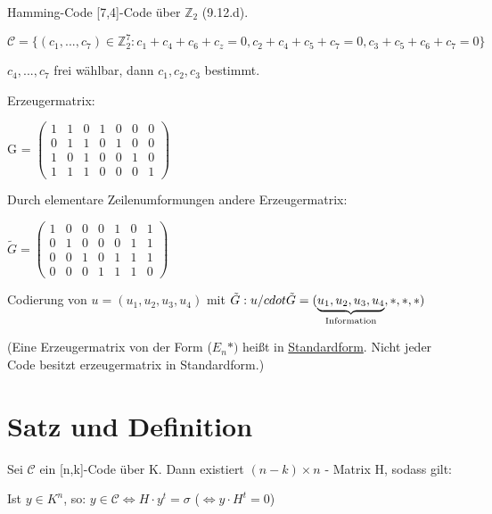   Hamming-Code [7,4]-Code über $\mathbb{Z}_2$ (9.12.d).

  \begin{center}

  $\mathcal{C} = \{(c_1, ..., c_7) \in \mathbb{Z}_2^7 : c_1 + c_4 + c_6 + c_z = 0, c_2 + c_4 + c_5 + c_7 = 0, c_3 + c_5 + c_6 + c_7 = 0 \}$

  \end{center}

  $c_4, ..., c_7$ frei wählbar, dann $c_1, c_2, c_3$ bestimmt.

  \par \medskip

  Erzeugermatrix:

  \begin{center}
    G = $\begin{pmatrix}1 & 1 & 0 & 1 & 0 & 0 & 0 \\ 0 & 1 & 1 & 0 & 1 & 0 & 0 \\ 1 & 0 & 1 & 0 & 0 & 1 & 0 \\ 1 & 1 & 1 & 0 & 0 & 0 & 1 \end{pmatrix}$
  \end{center}

  Durch elementare Zeilenumformungen andere Erzeugermatrix:

  \begin{center}
    $\tilde{G} = \begin{pmatrix}1 & 0 & 0 & 0 & 1 & 0 & 1 \\ 0 & 1 & 0 & 0 & 0 & 1 & 1 \\ 0 & 0 & 1 & 0 & 1 & 1 & 1 \\ 0 & 0 & 0 & 1 & 1 & 1 & 0 \end{pmatrix}$
  \end{center}

  Codierung von $u = (u_1, u_2, u_3, u_4)$ mit $\tilde{G}: u /cdot \tilde{G} = (\underbrace{u_1, u_2, u_3, u_4}_{\textnormal{Information}}, *,*,*)$

  (Eine Erzeugermatrix von der Form ($E_n *)$ heißt in \underline{Standardform}. Nicht jeder Code besitzt erzeugermatrix in Standardform.)

  \section{Satz und Definition}

  Sei $\mathcal{C}$ ein [n,k]-Code über K. Dann existiert $(n-k) \times n$ - Matrix H, sodass gilt:

  \begin{center}
  Ist $y \in K^n$, so: $y \in \mathcal{C} \Leftrightarrow H \cdot y^t = \sigma$ ($\Leftrightarrow y \cdot H^t = 0$)
  \end{center}

